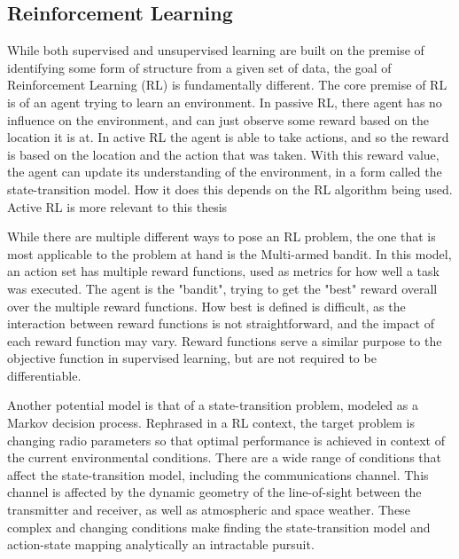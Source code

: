 	\subsection{Reinforcement Learning}


	\par While both supervised and unsupervised learning are built on the premise of identifying some form of structure from a given set of data, the goal of Reinforcement Learning (RL) is fundamentally different. The core premise of RL is of an agent trying to learn an environment. In passive RL, there agent has no influence on the environment, and can just observe some reward based on the location it is at. In active RL the agent is able to take actions, and so the reward is based on the location and the action that was taken. With this reward value, the agent can update its understanding of the environment, in a form called the state-transition model. How it does this depends on the RL algorithm being used. Active RL is more relevant to this thesis
	\par While there are multiple different ways to pose an RL problem, the one that is most applicable to the problem at hand is the Multi-armed bandit. In this model, an action set has multiple reward functions, used as metrics for how well a task was executed. 
	The agent is the "bandit", trying to get the "best" reward overall over the multiple reward functions. How best is defined is difficult, as the interaction between reward functions is not straightforward, and the impact of each reward function may vary. Reward functions serve a similar purpose to the objective function in supervised learning, but are not required to be differentiable.
	 \par Another potential model is that of a state-transition problem, modeled as a Markov decision process. Rephrased in a RL context, the target problem is changing radio parameters so that optimal performance is achieved in context of the current environmental conditions. There are a wide range of conditions that affect the state-transition model, including the communications channel. This channel is affected by the dynamic geometry of the line-of-sight between the transmitter and receiver, as well as atmospheric and space weather. These complex and changing conditions make finding the state-transition model and action-state mapping analytically an intractable pursuit. 
